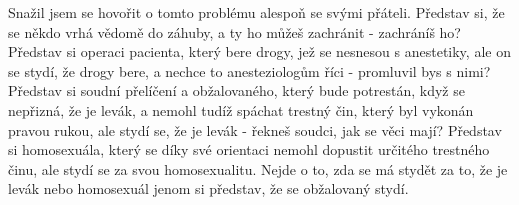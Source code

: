 \documentclass[13pt, a4paper, twoside]{article}
\begin{document}
Snažil jsem se hovořit o tomto problému alespoň se svými přáteli. Představ si, že se někdo vrhá vědomě do záhuby, a ty ho můžeš zachránit - zachráníš ho? Představ si operaci pacienta, který bere drogy, jež se nesnesou s anestetiky, ale on se stydí, že drogy bere, a nechce to anesteziologům říci
- promluvil bys s nimi? Představ si soudní přelíčení a obžalovaného, který bude potrestán, když se nepřizná, že je levák, a nemohl tudíž spáchat trestný čin, který byl vykonán pravou rukou, ale stydí se, že je levák - řekneš soudci, jak se věci mají? Představ si homosexuála, který se díky své orientaci nemohl dopustit určitého trestného činu, ale stydí se za svou homosexualitu. Nejde o to, zda se má stydět za to, že je levák nebo homosexuál jenom si představ, že se obžalovaný stydí.
 
\end{document}
